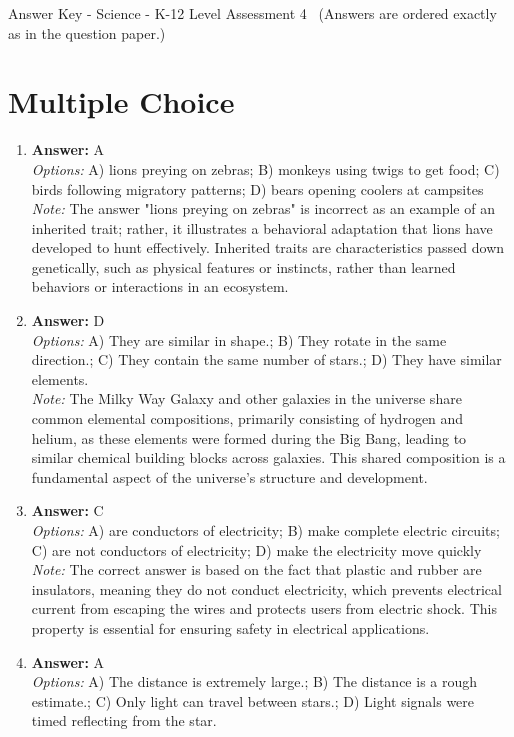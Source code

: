 \documentclass[12pt]{article}
\begin{document}
\begin{center}
Answer Key - Science - K-12 Level Assessment 4 \
\small (Answers are ordered exactly as in the question paper.)
\end{center}

\section*{Multiple Choice}
\begin{enumerate}[label=\arabic*.]
\item \textbf{Answer:} A
\\ \textit{Options:} A) lions preying on zebras; B) monkeys using twigs to get food; C) birds following migratory patterns; D) bears opening coolers at campsites
\\ \textit{Note:} The answer "lions preying on zebras" is incorrect as an example of an inherited trait; rather, it illustrates a behavioral adaptation that lions have developed to hunt effectively. Inherited traits are characteristics passed down genetically, such as physical features or instincts, rather than learned behaviors or interactions in an ecosystem.
\item \textbf{Answer:} D
\\ \textit{Options:} A) They are similar in shape.; B) They rotate in the same direction.; C) They contain the same number of stars.; D) They have similar elements.
\\ \textit{Note:} The Milky Way Galaxy and other galaxies in the universe share common elemental compositions, primarily consisting of hydrogen and helium, as these elements were formed during the Big Bang, leading to similar chemical building blocks across galaxies. This shared composition is a fundamental aspect of the universe's structure and development.
\item \textbf{Answer:} C
\\ \textit{Options:} A) are conductors of electricity; B) make complete electric circuits; C) are not conductors of electricity; D) make the electricity move quickly
\\ \textit{Note:} The correct answer is based on the fact that plastic and rubber are insulators, meaning they do not conduct electricity, which prevents electrical current from escaping the wires and protects users from electric shock. This property is essential for ensuring safety in electrical applications.
\item \textbf{Answer:} A
\\ \textit{Options:} A) The distance is extremely large.; B) The distance is a rough estimate.; C) Only light can travel between stars.; D) Light signals were timed reflecting from the star.

\end{enumerate}
\end{document}

